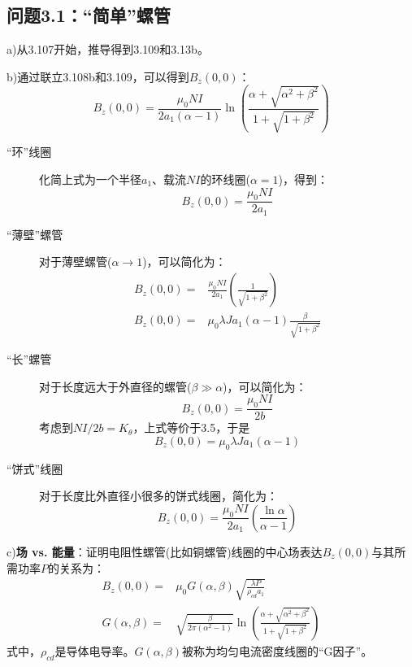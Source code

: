 \subsection{问题3.1：“简单”螺管}
a)从3.107开始，推导得到3.109和3.13b。

b)通过联立3.108b和3.109，可以得到$B_z(0,0)$：
\begin{equation}
B_z(0,0)=\frac{\mu_0NI}{2a_1(\alpha-1)}\ln\left(\frac{\alpha+\sqrt{\alpha^2+\beta^2}}{1+\sqrt{1+\beta^2}}\right)%
\end{equation}

\begin{description}
  \item[“环”线圈] 化简上式为一个半径$a_1$、载流$NI$的环线圈($\alpha=1$)，得到：
  \begin{equation}
    B_z(0,0)=\frac{\mu_0NI}{2a_1}%
  \end{equation}
 \item[“薄壁”螺管] 对于薄壁螺管($\alpha \rightarrow 1$)，可以简化为：
 \begin{align*}
   B_z(0,0)=&\frac{\mu_0NI}{2a_1}\left(\frac{1}{\sqrt{1+\beta^2}}\right)\tag{3.111b}\\ %
   B_z(0,0)=&\mu_0 \lambda Ja_1(\alpha-1)\frac{\beta}{\sqrt{1+\beta^2}}\tag{3.111c}%
 \end{align*}
  \item[“长”螺管] 对于长度远大于外直径的螺管($\beta \gg \alpha$)，可以简化为：
\begin{equation*}
B_z(0,0)=\frac{\mu_0NI}{2b} \tag{3.111d}%
\end{equation*}
考虑到$NI/2b=K_\theta$，上式等价于3.5，于是
\begin{equation*}
B_z(0,0)=\mu_0\lambda Ja_1(\alpha-1) \tag{3.111e}%
\end{equation*}
  \item[“饼式”线圈] 对于长度比外直径小很多的饼式线圈，简化为：
  \begin{equation*}
B_z(0,0)=\frac{\mu_0NI}{2a_1}(\frac{\ln\alpha}{\alpha-1}) \tag{3.111f}%
  \end{equation*}
\end{description}

c)\textbf{场 vs. 能量}：证明电阻性螺管(比如铜螺管)线圈的中心场表达$B_z(0,0)$与其所需功率$P$的关系为：
\begin{subequations}
	\begin{align}
B_z(0,0)=&\mu_0G(\alpha,\beta)\sqrt{\frac{\lambda P}{\rho_{cd}a_1}}\\ %
G(\alpha,\beta)=&\sqrt{\frac{\beta}{2\pi(\alpha^2-1)}}\ln(\frac{\alpha+\sqrt{\alpha^2+\beta^2}}{1+\sqrt{1+\beta^2}})%
	\end{align}
\end{subequations}
式中，$\rho_{cd}$是导体电导率。$G(\alpha,\beta)$被称为均匀电流密度线圈的“G因子”。


